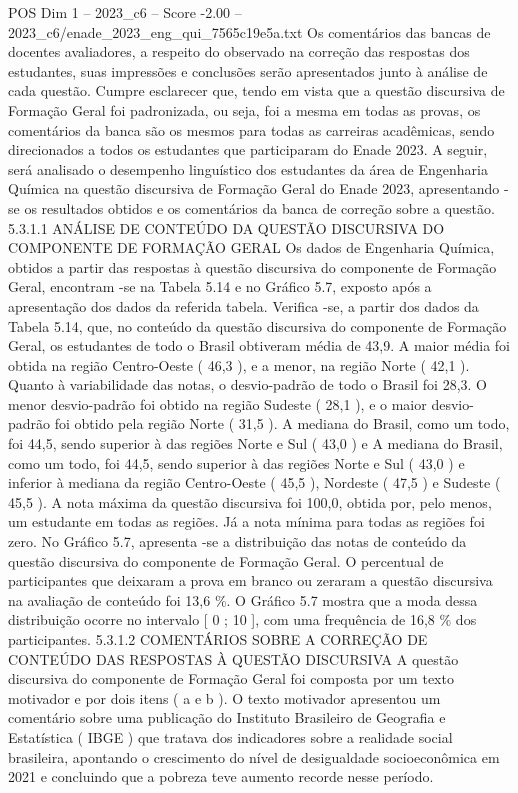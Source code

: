 \begin{textsample}{POS Dim 1 – 2023\_c6 – Score -2.00 – 2023\_c6/enade\_2023\_eng\_qui\_7565c19e5a.txt}
Os comentários das bancas de docentes avaliadores, a respeito do observado na correção das respostas dos estudantes, suas impressões e conclusões serão apresentados junto à análise de cada questão.
Cumpre esclarecer que, tendo em vista que a questão discursiva de Formação Geral foi padronizada, ou seja, foi a mesma em todas as provas, os comentários da banca são os mesmos para todas as carreiras acadêmicas, sendo direcionados a todos os estudantes que participaram do Enade 2023.
A seguir, será analisado o desempenho linguístico dos estudantes da área de Engenharia Química na questão discursiva de Formação Geral do Enade 2023, apresentando -se os resultados obtidos e os comentários da banca de correção sobre a questão. 5.3.1.1 ANÁLISE DE CONTEÚDO DA QUESTÃO DISCURSIVA DO COMPONENTE DE FORMAÇÃO GERAL Os dados de Engenharia Química, obtidos a partir das respostas à questão discursiva do componente de Formação Geral, encontram -se na Tabela 5.14 e no Gráfico 5.7, exposto após a apresentação dos dados da referida tabela.
Verifica -se, a partir dos dados da Tabela 5.14, que, no conteúdo da questão discursiva do componente de Formação Geral, os estudantes de todo o Brasil obtiveram média de 43,9.
A maior média foi obtida na região Centro-Oeste ( 46,3 ), e a menor, na região Norte ( 42,1 ).
Quanto à variabilidade das notas, o desvio-padrão de todo o Brasil foi 28,3.
O menor desvio-padrão foi obtido na região Sudeste ( 28,1 ), e o maior desvio-padrão foi obtido pela região Norte ( 31,5 ).
A mediana do Brasil, como um todo, foi 44,5, sendo superior à das regiões Norte e Sul ( 43,0 ) e A mediana do Brasil, como um todo, foi 44,5, sendo superior à das regiões Norte e Sul ( 43,0 ) e inferior à mediana da região Centro-Oeste ( 45,5 ), Nordeste ( 47,5 ) e Sudeste ( 45,5 ).
A nota máxima da questão discursiva foi 100,0, obtida por, pelo menos, um estudante em todas as regiões.
Já a nota mínima para todas as regiões foi zero.
No Gráfico 5.7, apresenta -se a distribuição das notas de conteúdo da questão discursiva do componente de Formação Geral.
O percentual de participantes que deixaram a prova em branco ou zeraram a questão discursiva na avaliação de conteúdo foi 13,6 \%.
O Gráfico 5.7 mostra que a moda dessa distribuição ocorre no intervalo [ 0 ; 10 ], com uma frequência de 16,8 \% dos participantes. 5.3.1.2 COMENTÁRIOS SOBRE A CORREÇÃO DE CONTEÚDO DAS RESPOSTAS À QUESTÃO DISCURSIVA A questão discursiva do componente de Formação Geral foi composta por um texto motivador e por dois itens ( a e b ).
O texto motivador apresentou um comentário sobre uma publicação do Instituto Brasileiro de Geografia e Estatística ( IBGE ) que tratava dos indicadores sobre a realidade social brasileira, apontando o crescimento do nível de desigualdade socioeconômica em 2021 e concluindo que a pobreza teve aumento recorde nesse período.

\end{textsample}
